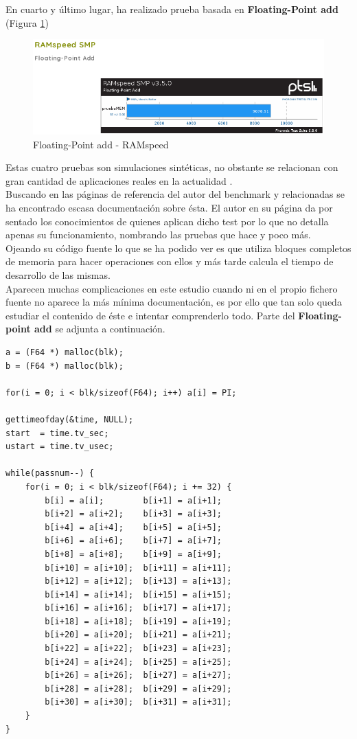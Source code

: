 En cuarto y último lugar, ha realizado prueba basada en \textbf{Floating-Point add} (Figura \ref{fig:figura1-1-4})

\begin{figure}[H] %
	\centering
	\includegraphics[scale=0.8]{figuras/ejercicio1/resultados/figura1-1-4.png} 
	\caption{Floating-Point add - RAMspeed} 
	\label{fig:figura1-1-4}
\end{figure}


Estas cuatro pruebas son simulaciones sintéticas, no obstante se relacionan con gran cantidad de aplicaciones reales en la actualidad \cite{enlace3}. 
\\

Buscando en las páginas de referencia del autor del benchmark y relacionadas se ha encontrado escasa documentación sobre ésta. El autor en su página da por sentado los conocimientos de quienes aplican dicho test por lo que no detalla apenas su funcionamiento, nombrando las pruebas que hace y poco más.\\

Ojeando su código fuente lo que se ha podido ver es que utiliza bloques completos de memoria para hacer operaciones con ellos y más tarde calcula el tiempo de desarrollo de las mismas.
\\

Aparecen muchas complicaciones en este estudio cuando ni en el propio fichero fuente no aparece la más mínima documentación, es por ello que tan solo queda estudiar el contenido de éste e intentar comprenderlo todo. Parte del \textbf{Floating-point add} se adjunta a continuación.

\begin{lstlisting}[style=cmas]
a = (F64 *) malloc(blk);
b = (F64 *) malloc(blk);
	
for(i = 0; i < blk/sizeof(F64); i++) a[i] = PI;

gettimeofday(&time, NULL);
start  = time.tv_sec;
ustart = time.tv_usec;

while(passnum--) {
	for(i = 0; i < blk/sizeof(F64); i += 32) {
		b[i] = a[i];        b[i+1] = a[i+1];
		b[i+2] = a[i+2];    b[i+3] = a[i+3];
		b[i+4] = a[i+4];    b[i+5] = a[i+5];
		b[i+6] = a[i+6];    b[i+7] = a[i+7];
		b[i+8] = a[i+8];    b[i+9] = a[i+9];
		b[i+10] = a[i+10];  b[i+11] = a[i+11];
		b[i+12] = a[i+12];  b[i+13] = a[i+13];
		b[i+14] = a[i+14];  b[i+15] = a[i+15];
		b[i+16] = a[i+16];  b[i+17] = a[i+17];
		b[i+18] = a[i+18];  b[i+19] = a[i+19];
		b[i+20] = a[i+20];  b[i+21] = a[i+21];
		b[i+22] = a[i+22];  b[i+23] = a[i+23];
		b[i+24] = a[i+24];  b[i+25] = a[i+25];
		b[i+26] = a[i+26];  b[i+27] = a[i+27];
		b[i+28] = a[i+28];  b[i+29] = a[i+29];
		b[i+30] = a[i+30];  b[i+31] = a[i+31];
	}
}
\end{lstlisting}

